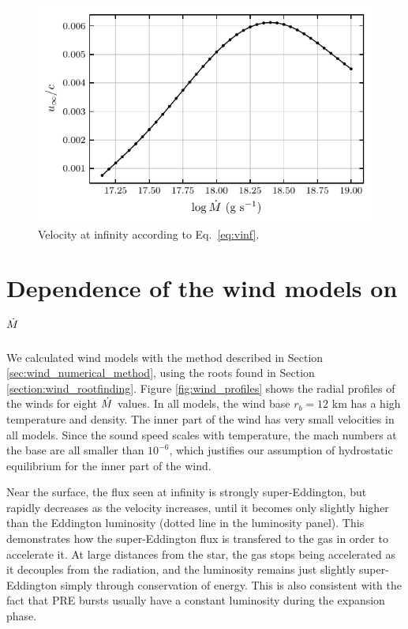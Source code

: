 \documentclass[../main.tex]{subfiles}
\begin{document}
\begin{figure}[htb!]
    \centering
    \includegraphics{figures/wind_vinf.pdf}
    \caption[Velocity at infinity of wind models]{Velocity at infinity according to Eq.~\eqref{eq:vinf}.}
    \label{fig:wind_vinf}
\end{figure}


\section{Dependence of the wind models on $\dot{M}$}\label{sec:wind_results}

We calculated wind models with the method described in Section \ref{sec:wind_numerical_method}, using the roots found in Section \ref{section:wind_rootfinding}. Figure \ref{fig:wind_profiles} shows the radial profiles of the winds for eight $\dot{M}$ values. In all models, the wind base $r_b=12$ km has a high temperature and density. The inner part of the wind has very small velocities in all models. Since the sound speed scales with temperature, the mach numbers at the base are all smaller than $10^{-6}$, which justifies our assumption of hydrostatic equilibrium for the inner part of the wind.   

Near the surface, the flux seen at infinity is strongly super-Eddington, but rapidly decreases as the velocity increases, until it becomes only slightly higher than the Eddington luminosity (dotted line in the luminosity panel). This demonstrates how the super-Eddington flux is transfered to the gas in order to accelerate it. At large distances from the star, the gas stops being accelerated as it decouples from the radiation, and the luminosity remains just slightly super-Eddington simply through conservation of energy. This is also consistent with the fact that PRE bursts usually have a constant luminosity during the expansion phase.  
\end{document}
